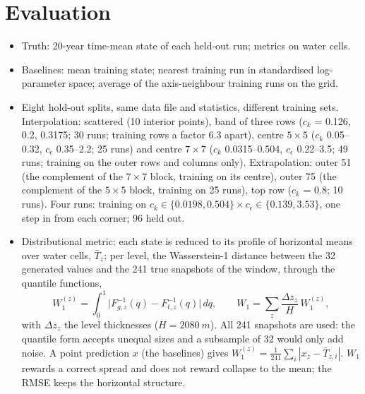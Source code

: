 \documentclass[11pt,a4paper]{article}
\begin{document}
\section{Evaluation}
\begin{itemize}
  \item Truth: 20-year time-mean state of each held-out run; metrics on water cells.
  \item Baselines: mean training state; nearest training run in standardised log-parameter space; average of
        the axis-neighbour training runs on the grid.
  \item Eight hold-out splits, same data file and statistics, different training sets. Interpolation:
        scattered (10 interior points), band of three rows ($c_k$ = 0.126, 0.2, 0.3175; 30 runs; training rows a
        factor 6.3 apart), centre $5\times5$ ($c_k$ 0.05--0.32, $c_\epsilon$ 0.35--2.2; 25 runs) and centre $7\times7$
        ($c_k$ 0.0315--0.504, $c_\epsilon$ 0.22--3.5; 49 runs; training on the outer rows and columns only).
        Extrapolation: outer 51 (the complement of the $7\times7$ block, training on its centre), outer 75 (the
        complement of the $5\times5$ block, training on 25 runs), top row ($c_k$ = 0.8; 10 runs). Four runs: training
        on $c_k \in \{0.0198, 0.504\} \times c_\epsilon \in \{0.139, 3.53\}$, one step in from each corner; 96 held out.
  \item Distributional metric: each state is reduced to its profile of horizontal means over water cells,
        $\bar T_z$; per level, the Wasserstein-1 distance between the 32 generated values and the 241 true
        snapshots of the window, through the quantile functions,
        \begin{equation}
          W_1^{(z)} = \int_0^1 \big| F_{g,z}^{-1}(q) - F_{t,z}^{-1}(q) \big|\, dq, \qquad
          W_1 = \sum_z \frac{\Delta z_z}{H}\, W_1^{(z)} ,
        \end{equation}
        with $\Delta z_z$ the level thicknesses ($H = \SI{2080}{m}$). All 241 snapshots are used: the quantile
        form accepts unequal sizes and a subsample of 32 would only add noise. A point prediction $x$ (the
        baselines) gives $W_1^{(z)} = \frac{1}{241}\sum_i |x_z - \bar T_{z,i}|$. $W_1$ rewards a correct spread and
        does not reward collapse to the mean; the RMSE keeps the horizontal structure.
\end{itemize}
\end{document}
